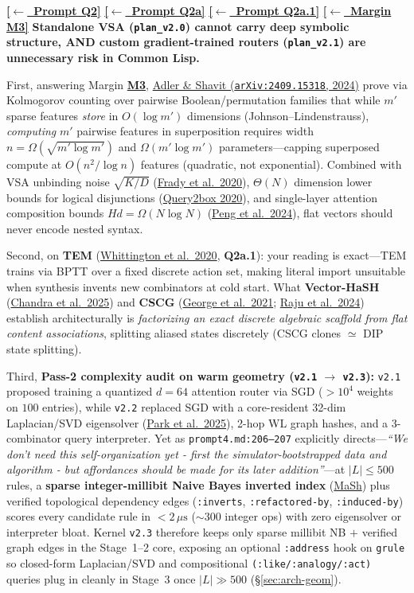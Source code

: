 \documentclass[12pt]{article}
\newcommand{\ansback}[2]{\hyperlink{#1}{\textcolor{qpurple}{\textbf{\small[\(\leftarrow\)~#2]}}}}
\newcommand{\litref}[2]{\hyperlink{lit:#1}{\textcolor{citegreen}{#2}}}
\begin{document}
\ansback{q:2}{Prompt Q2} \ansback{q:2a}{Prompt Q2a} \ansback{q:2a1}{Prompt Q2a.1} \ansback{q:m3}{Margin M3}
\textbf{Standalone VSA (\texttt{plan\_v2.0}) cannot carry deep symbolic structure, AND custom gradient-trained routers (\texttt{plan\_v2.1}) are unnecessary risk in Common Lisp.}

First, answering Margin \hyperlink{q:m3}{\textbf{M3}}, \litref{adler2024}{Adler \& Shavit (\texttt{arXiv:2409.15318}, 2024)} prove via Kolmogorov counting over pairwise Boolean/permutation families that while $m'$ sparse features \emph{store} in $O(\log m')$ dimensions (Johnson--Lindenstrauss), \emph{computing} $m'$ pairwise features in superposition requires width $n = \Omega(\sqrt{m' \log m'})$ and $\Omega(m' \log m')$ parameters---capping superposed compute at $O(n^2/\log n)$ features (quadratic, not exponential). Combined with VSA unbinding noise $\sqrt{K/D}$ (\litref{frady2020}{Frady et al.\ 2020}), $\Theta(N)$ dimension lower bounds for logical disjunctions (\litref{ren2020}{Query2box 2020}), and single-layer attention composition bounds $H d = \Omega(N \log N)$ (\litref{peng2024}{Peng et al.\ 2024}), flat vectors should never encode nested syntax.

Second, on \textbf{TEM} (\litref{whittington2020}{Whittington et al.\ 2020}, \textbf{Q2a.1}): your reading is exact---TEM trains via BPTT over a fixed discrete action set, making literal import unsuitable when synthesis invents new combinators at cold start. What \textbf{Vector-HaSH} (\litref{chandra2025}{Chandra et al.\ 2025}) and \textbf{CSCG} (\litref{george2021}{George et al.\ 2021}; \litref{raju2024}{Raju et al.\ 2024}) establish architecturally is \emph{factorizing an exact discrete algebraic scaffold from flat content associations}, splitting aliased states discretely (CSCG clones $\simeq$ DIP state splitting).

Third, \textbf{Pass-2 complexity audit on warm geometry (\texttt{v2.1} $\to$ \texttt{v2.3}):} \texttt{v2.1} proposed training a quantized $d=64$ attention router via SGD ($>10^4$ weights on $100$ entries), while \texttt{v2.2} replaced SGD with a core-resident 32-dim Laplacian/SVD eigensolver (\litref{park2025}{Park et al.\ 2025}), 2-hop WL graph hashes, and a 3-combinator query interpreter. Yet as \texttt{prompt4.md:206--207} explicitly directs---\emph{``We don't need this self-organization yet - first the simulator-bootstrapped data and algorithm - but affordances should be made for its later addition''}---at $|L| \le 500$ rules, a \textbf{sparse integer-millibit Naive Bayes inverted index} (\litref{kuhlwein2013}{MaSh}) plus verified topological dependency edges (\texttt{:inverts}, \texttt{:refactored-by}, \texttt{:induced-by}) scores every candidate rule in $<2\,\mu\mathrm{s}$ ($\sim 300$ integer ops) with zero eigensolver or interpreter bloat. Kernel \texttt{v2.3} therefore keeps only sparse millibit NB $+$ verified graph edges in the Stage~1--2 core, exposing an optional \texttt{:address} hook on \texttt{grule} so closed-form Laplacian/SVD and compositional \texttt{(:like/:analogy/:act)} queries plug in cleanly in Stage~3 once $|L|\gg 500$ (\S\ref{sec:arch-geom}).
\end{document}

